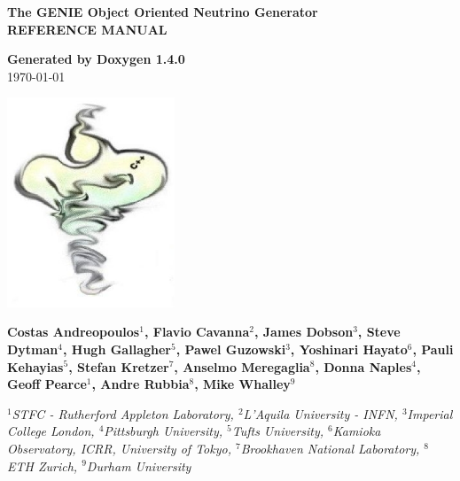 \documentclass[a4paper]{book}
\begin{document}
\begin{titlepage}
\vspace*{3cm}
\begin{center}

{\Large \textbf{The GENIE Object Oriented Neutrino Generator}}\\
\vspace*{1cm}
{\Large \textbf{REFERENCE MANUAL}}\\
\vspace*{1cm}

{\large \textbf{Generated by Doxygen 1.4.0}}\\
\vspace*{0.5cm}
{\large \today}\\
\vspace*{1cm}

\includegraphics[width=5cm,keepaspectratio]{../../data/logo/genie_logo.eps}

\vspace*{0.6cm}

{\textbf{Costas Andreopoulos$^{1}$, Flavio Cavanna$^{2}$, James Dobson$^{3}$, Steve Dytman$^{4}$,
Hugh Gallagher$^{5}$, Pawel Guzowski$^{3}$, Yoshinari Hayato$^{6}$, Pauli Kehayias$^{5}$, 
Stefan Kretzer$^{7}$, Anselmo Meregaglia$^{8}$, Donna Naples$^{4}$, Geoff Pearce$^{1}$, 
Andre Rubbia$^{8}$, Mike Whalley$^{9}$}}\\
\vspace*{0.5cm}

{\textit{
$^{1}$STFC - Rutherford Appleton Laboratory,
$^{2}$L'Aquila University - INFN, 
$^{3}$Imperial College London, 
$^{4}$Pittsburgh University, 
$^{5}$Tufts University,
$^{6}$Kamioka Observatory, ICRR, University of Tokyo, 
$^{7}$Brookhaven National Laboratory, 
$^{8}$ETH Zurich, 
$^{9}$Durham University}}

\end{center}
\end{titlepage}
\clearemptydoublepage
{}
\tableofcontents
\clearemptydoublepage
{}
\end{document}
